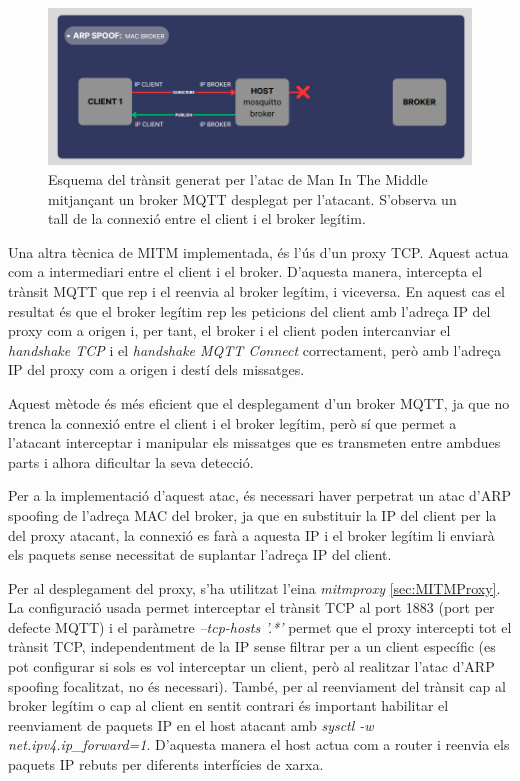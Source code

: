   \begin{figure}[H]
    \centering
    \includegraphics[width=1\textwidth]{img/mitmbroker.png}
    \caption{Esquema del trànsit generat per l'atac de Man In The Middle mitjançant un broker MQTT desplegat per l'atacant. S'observa un tall de la connexió entre el client i el broker legítim.}
    \label{fig:MITMbroker}
  \end{figure}

Una altra tècnica de MITM implementada, és l'ús d'un proxy TCP. Aquest actua com a intermediari entre el client i el broker. D'aquesta manera, intercepta el trànsit MQTT que rep i el reenvia al broker legítim, i viceversa. En aquest cas el resultat és que el broker legítim rep les peticions del client amb l'adreça IP del proxy com a origen i, per tant, el broker i el client poden intercanviar el \textit{handshake TCP} i el \textit{handshake MQTT Connect} correctament, però amb l'adreça IP del proxy com a origen i destí dels missatges.

Aquest mètode és més eficient que el desplegament d'un broker MQTT, ja que no trenca la connexió entre el client i el broker legítim, però sí que permet a l'atacant interceptar i manipular els missatges que es transmeten entre ambdues parts i alhora dificultar la seva detecció. 

Per a la implementació d'aquest atac, és necessari haver perpetrat un atac d'ARP spoofing de l'adreça MAC del broker, ja que en substituir la IP del client per la del proxy atacant, la connexió es farà a aquesta IP i el broker legítim li enviarà els paquets sense necessitat de suplantar l'adreça IP del client.

Per al desplegament del proxy, s'ha utilitzat l'eina \textit{mitmproxy} \ref{sec:MITMProxy}. La configuració usada permet interceptar el trànsit TCP al port 1883 (port per defecte MQTT) i el paràmetre \textit{--tcp-hosts '.*'} permet que el proxy intercepti tot el trànsit TCP, independentment de la IP sense filtrar per a un client específic (es pot configurar si sols es vol interceptar un client, però al realitzar l'atac d'ARP spoofing focalitzat, no és necessari). També, per al reenviament del trànsit cap al broker legítim o cap al client en sentit contrari és important habilitar el reenviament de paquets IP en el host atacant amb \textit{sysctl -w net.ipv4.ip\_forward=1}. D'aquesta manera el host actua com a router i reenvia els paquets IP rebuts per diferents interfícies de xarxa.


